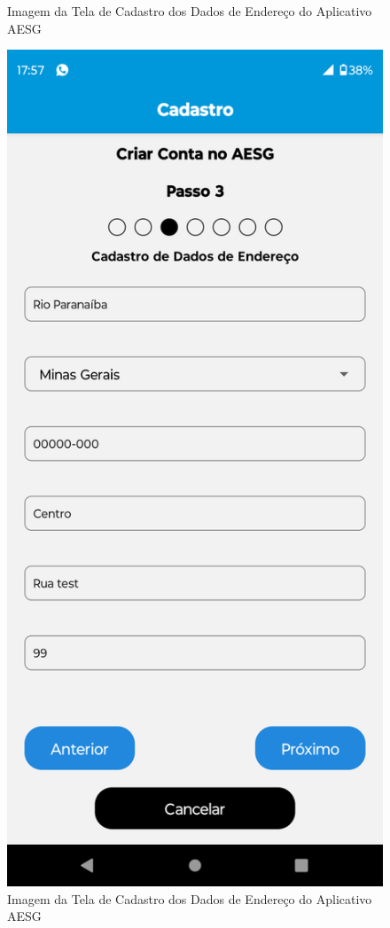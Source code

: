 \documentclass[
    12pt,                   %
    openright,              %
    oneside,                %
    a4paper,                %
    sumario=tradicional,    %
    english,                %
    brazil,                 %
    ]{abntex2}
\begin{document}
\begin{figure}[!h]
\begin{minipage}{0.5\textwidth}
                    \caption[Imagem da Tela de Cadastro dos Dados de Endereço do Aplicativo AESG]{ 
                    Imagem da Tela de Cadastro dos Dados de Endereço do Aplicativo AESG}
                    \label{fig:AppTelaCadastro12}
                \end{minipage}%
                \begin{minipage}{0.5\textwidth}
                    \centering
                    \includegraphics[width=0.8\linewidth]{Imagens/App Images User/AUCadastro3.png}
                    \caption[Imagem da Tela de Cadastro dos Dados de Endereço Preenchido do Aplicativo AESG]{ 
                    Imagem da Tela de Cadastro dos Dados de Endereço do Aplicativo AESG}
                    \label{fig:AppTelaCadastro3}
                \end{minipage}
            \end{figure}
\end{document}
